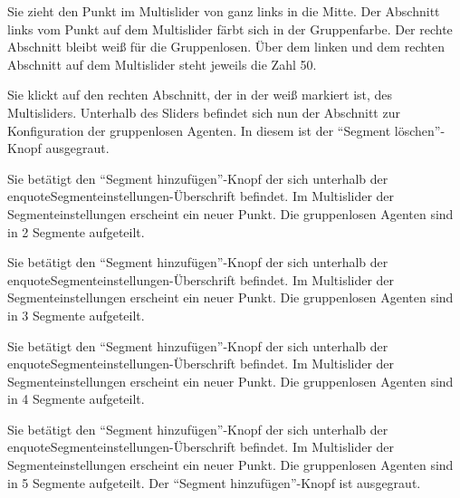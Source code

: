 \documentclass[parskip=full,11pt]{scrartcl}
\begin{document}
{Sie zieht den Punkt im Multislider von ganz links in die Mitte.}
{Der Abschnitt links vom Punkt auf dem Multislider färbt sich in der Gruppenfarbe. Der rechte Abschnitt bleibt weiß für die Gruppenlosen. Über dem linken und dem rechten Abschnitt auf dem Multislider steht jeweils die Zahl 50.}

{Sie klickt auf den rechten Abschnitt, der in der weiß markiert ist, des Multisliders.}
{Unterhalb des Sliders befindet sich nun der Abschnitt zur Konfiguration der gruppenlosen Agenten. In diesem ist der \enquote{Segment löschen}-Knopf ausgegraut.}

{Sie betätigt den \enquote{Segment hinzufügen}-Knopf der sich unterhalb der enquote{Segmenteinstellungen}-Überschrift befindet.}
{Im Multislider der Segmenteinstellungen erscheint ein neuer Punkt. Die gruppenlosen Agenten sind in 2 Segmente aufgeteilt.}

{Sie betätigt den \enquote{Segment hinzufügen}-Knopf der sich unterhalb der enquote{Segmenteinstellungen}-Überschrift befindet.}
{Im Multislider der Segmenteinstellungen erscheint ein neuer Punkt. Die gruppenlosen Agenten sind in 3 Segmente aufgeteilt.}

{Sie betätigt den \enquote{Segment hinzufügen}-Knopf der sich unterhalb der enquote{Segmenteinstellungen}-Überschrift befindet.}
{Im Multislider der Segmenteinstellungen erscheint ein neuer Punkt. Die gruppenlosen Agenten sind in 4 Segmente aufgeteilt.}

{Sie betätigt den \enquote{Segment hinzufügen}-Knopf der sich unterhalb der enquote{Segmenteinstellungen}-Überschrift befindet.}
{Im Multislider der Segmenteinstellungen erscheint ein neuer Punkt. Die gruppenlosen Agenten sind in 5 Segmente aufgeteilt. Der \enquote{Segment hinzufügen}-Knopf ist ausgegraut.}
\end{document}
